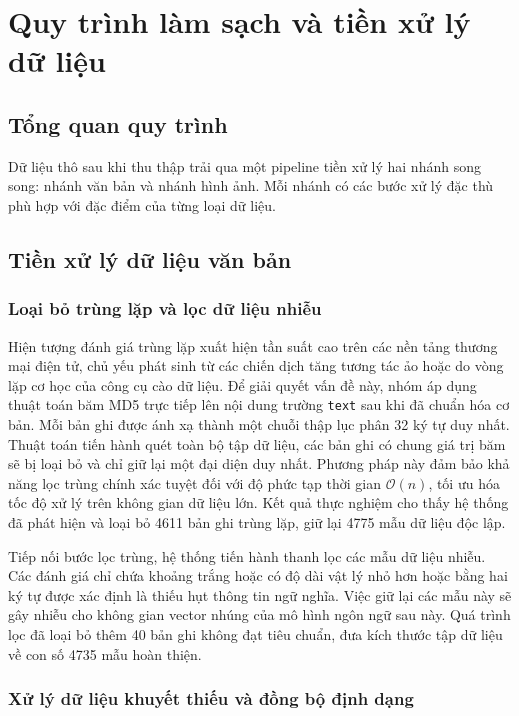 \section{Quy trình làm sạch và tiền xử lý dữ liệu}

\subsection{Tổng quan quy trình}

Dữ liệu thô sau khi thu thập trải qua một pipeline tiền xử lý hai nhánh song song: nhánh văn bản và nhánh hình ảnh. Mỗi nhánh có các bước xử lý đặc thù phù hợp với đặc điểm của từng loại dữ liệu.

\subsection{Tiền xử lý dữ liệu văn bản}

\subsubsection{Loại bỏ trùng lặp và lọc dữ liệu nhiễu}

Hiện tượng đánh giá trùng lặp xuất hiện tần suất cao trên các nền tảng thương mại điện tử, chủ yếu phát sinh từ các chiến dịch tăng tương tác ảo hoặc do vòng lặp cơ học của công cụ cào dữ liệu. Để giải quyết vấn đề này, nhóm áp dụng thuật toán băm MD5 trực tiếp lên nội dung trường \texttt{text} sau khi đã chuẩn hóa cơ bản. Mỗi bản ghi được ánh xạ thành một chuỗi thập lục phân 32 ký tự duy nhất. Thuật toán tiến hành quét toàn bộ tập dữ liệu, các bản ghi có chung giá trị băm sẽ bị loại bỏ và chỉ giữ lại một đại diện duy nhất. Phương pháp này đảm bảo khả năng lọc trùng chính xác tuyệt đối với độ phức tạp thời gian $\mathcal{O}(n)$, tối ưu hóa tốc độ xử lý trên không gian dữ liệu lớn. Kết quả thực nghiệm cho thấy hệ thống đã phát hiện và loại bỏ 4611 bản ghi trùng lặp, giữ lại 4775 mẫu dữ liệu độc lập.

Tiếp nối bước lọc trùng, hệ thống tiến hành thanh lọc các mẫu dữ liệu nhiễu. Các đánh giá chỉ chứa khoảng trắng hoặc có độ dài vật lý nhỏ hơn hoặc bằng hai ký tự được xác định là thiếu hụt thông tin ngữ nghĩa. Việc giữ lại các mẫu này sẽ gây nhiễu cho không gian vector nhúng của mô hình ngôn ngữ sau này. Quá trình lọc đã loại bỏ thêm 40 bản ghi không đạt tiêu chuẩn, đưa kích thước tập dữ liệu về con số 4735 mẫu hoàn thiện.

\subsubsection{Xử lý dữ liệu khuyết thiếu và đồng bộ định dạng}

